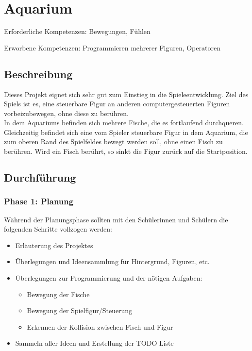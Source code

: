 \section{Aquarium}\label{aquarium}

Erforderliche Kompetenzen: Bewegungen, Fühlen

Erworbene Kompetenzen: Programmieren mehrerer Figuren, Operatoren

\begin{figure}[ht]
    \centering 
    \caption[\Sectionname]{\Sectionname}
\end{figure}

\subsection{Beschreibung}\label{beschreibung}

Dieses Projekt eignet sich sehr gut zum Einstieg in die
Spieleentwicklung. Ziel des Spiels ist es, eine steuerbare Figur an
anderen computergesteuerten Figuren vorbeizubewegen, ohne diese zu
berühren.\\
In dem Aquariums befinden sich mehrere Fische, die es fortlaufend
durchqueren. Gleichzeitig befindet sich eine vom Spieler steuerbare
Figur in dem Aquarium, die zum oberen Rand des Spielfeldes bewegt werden
soll, ohne einen Fisch zu berühren. Wird ein Fisch berührt, so sinkt die
Figur zurück auf die Startposition.

\subsection{Durchführung}\label{durchfuxfchrung}

\subsubsection{Phase 1: Planung}\label{phase-1-planung}

Während der Planungsphase sollten mit den Schülerinnen und Schülern die
folgenden Schritte vollzogen werden:

\begin{itemize}
\item
  Erläuterung des Projektes
\item
  Überlegungen und Ideensammlung für Hintergrund, Figuren, etc.
\item
  Überlegungen zur Programmierung und der nötigen Aufgaben:

  \begin{itemize}
  \item
    Bewegung der Fische
  \item
    Bewegung der Spielfigur/Steuerung
  \item
    Erkennen der Kollision zwischen Fisch und Figur
  \end{itemize}
\item
  Sammeln aller Ideen und Erstellung der TODO Liste
\end{itemize}


